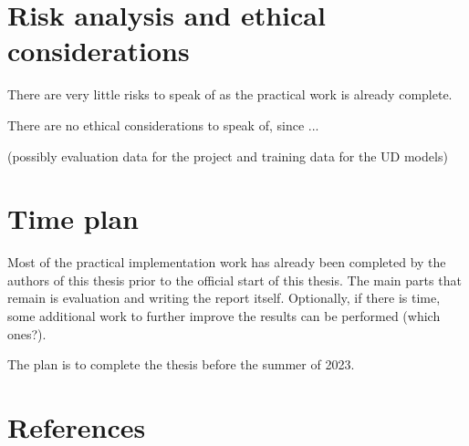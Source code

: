 \documentclass{article}
\begin{document}


\section{Risk analysis and ethical considerations}
There are very little risks to speak of as the practical work is already complete.

There are no ethical considerations to speak of, since ...


(possibly evaluation data for the project and training data for the UD models)


\section{Time plan}
Most of the practical implementation work has already been completed by the authors of this thesis prior to the official start of this thesis.
The main parts that remain is evaluation and writing the report itself. Optionally, if there is time, some additional work to further improve the results can be performed (which ones?).

The plan is to complete the thesis before the summer of 2023.










\section{References}






\end{document}
